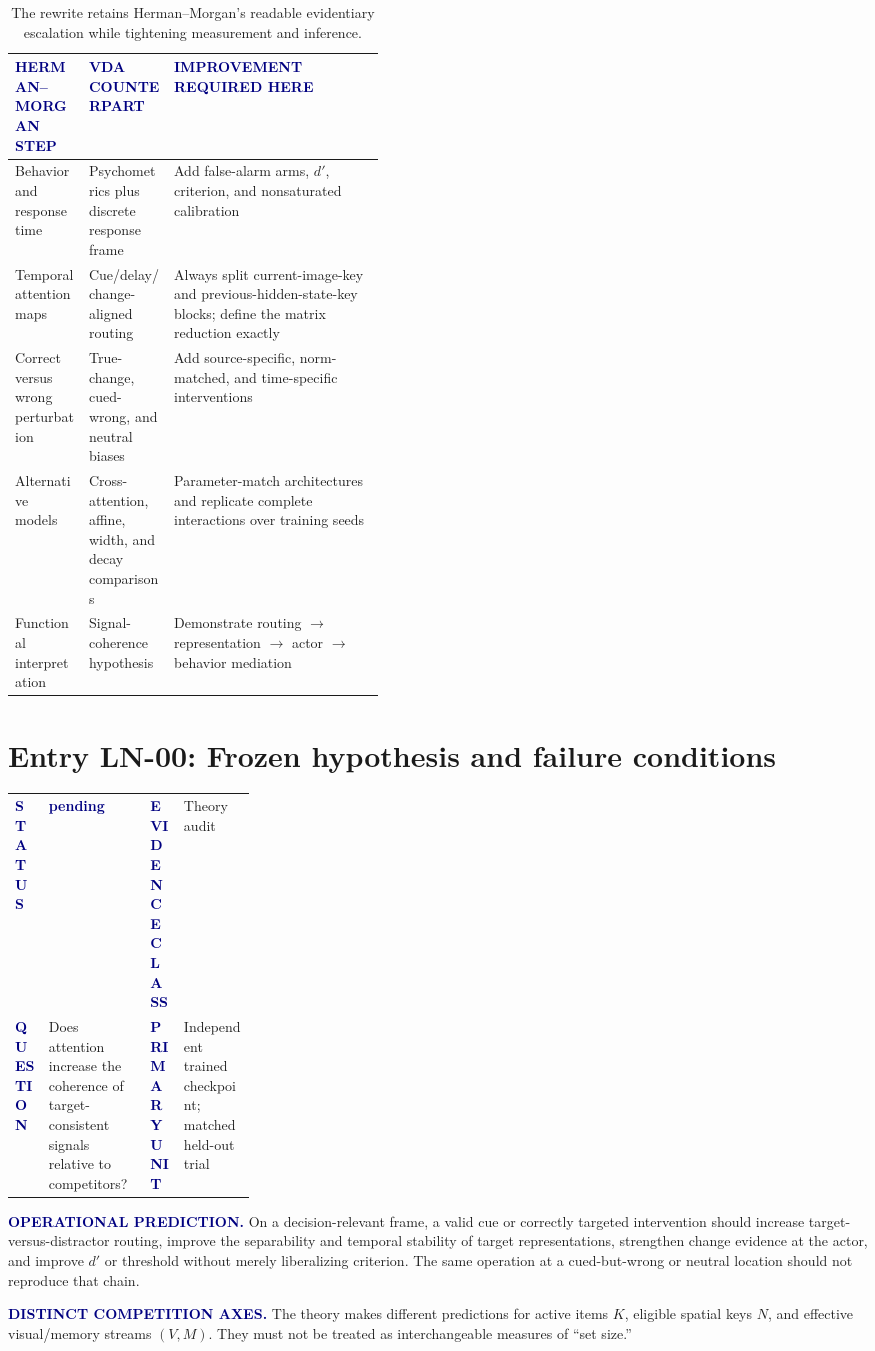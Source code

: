 \documentclass[11pt]{article}
\makeatletter
\newcommand{\statuspending}{\colorbox{PaleBlue}{\textcolor{Navy}{\sffamily\bfseries pending}}}
\newcommand{\smallcapslabel}[1]{\textcolor{Navy}{\sffamily\bfseries\footnotesize\MakeUppercase{#1}}}
\newcommand{\entrymeta}[4]{%
  \noindent\begin{tabularx}{\linewidth}{@{}L{0.14\linewidth}Y L{0.14\linewidth}Y@{}}
  \toprule
  \smallcapslabel{Status} & #1 & \smallcapslabel{Evidence class} & #2\\
  \smallcapslabel{Question} & #3 & \smallcapslabel{Primary unit} & #4\\
  \bottomrule
  \end{tabularx}
}
\makeatother
\begin{document}
\begin{table}[H]
\centering\small
\begin{tabularx}{\linewidth}{@{}L{0.20\linewidth}L{0.23\linewidth}Y@{}}
\toprule
\smallcapslabel{Herman--Morgan step} & \smallcapslabel{VDA counterpart} & \smallcapslabel{Improvement required here}\\
\midrule
Behavior and response time & Psychometrics plus discrete response frame & Add false-alarm arms, $d'$, criterion, and nonsaturated calibration\\
Temporal attention maps & Cue/delay/change-aligned routing & Always split current-image-key and previous-hidden-state-key blocks; define the matrix reduction exactly\\
Correct versus wrong perturbation & True-change, cued-wrong, and neutral biases & Add source-specific, norm-matched, and time-specific interventions\\
Alternative models & Cross-attention, affine, width, and decay comparisons & Parameter-match architectures and replicate complete interactions over training seeds\\
Functional interpretation & Signal-coherence hypothesis & Demonstrate routing $\rightarrow$ representation $\rightarrow$ actor $\rightarrow$ behavior mediation\\
\bottomrule
\end{tabularx}
\caption{The rewrite retains Herman--Morgan's readable evidentiary escalation while tightening measurement and inference.}
\end{table}

\section{Entry LN-00: Frozen hypothesis and failure conditions}
\entrymeta{\statuspending}{Theory audit}{Does attention increase the coherence of target-consistent signals relative to competitors?}{Independent trained checkpoint; matched held-out trial}

\smallcapslabel{Operational prediction.}
On a decision-relevant frame, a valid cue or correctly targeted intervention should increase target-versus-distractor routing, improve the separability and temporal stability of target representations, strengthen change evidence at the actor, and improve $d'$ or threshold without merely liberalizing criterion. The same operation at a cued-but-wrong or neutral location should not reproduce that chain.

\smallcapslabel{Distinct competition axes.}
The theory makes different predictions for active items $K$, eligible spatial keys $N$, and effective visual/memory streams $(V,M)$. They must not be treated as interchangeable measures of ``set size.''
\end{document}
